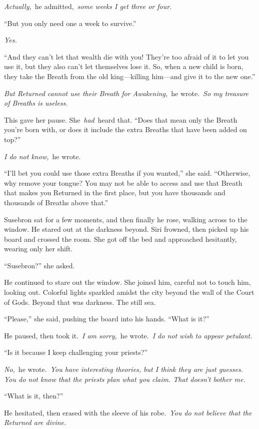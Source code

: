 \textit{Actually,}~he admitted,~\textit{some weeks I get three or four.}

“But you only need one a week to survive.”

\textit{Yes.}

“And they can’t let that wealth die with you! They’re too afraid of it to let you use it, but they also can’t let themselves lose it. So, when a new child is born, they take the Breath from the old king—killing him—and give it to the new one.”

\textit{But Returned cannot use their Breath for Awakening,}~he wrote.~\textit{So my treasure of Breaths is useless.}

This gave her pause. She~\textit{had}~heard that. “Does that mean only the Breath you’re born with, or does it include the extra Breaths that have been added on top?”

\textit{I do not know,}~he wrote.

“I’ll bet you could use those extra Breaths if you wanted,” she said. “Otherwise, why remove your tongue? You may not be able to access and use that Breath that makes you Returned in the first place, but you have thousands and thousands of Breaths above that.”

Susebron sat for a few moments, and then finally he rose, walking across to the window. He stared out at the darkness beyond. Siri frowned, then picked up his board and crossed the room. She got off the bed and approached hesitantly, wearing only her shift.

“Susebron?” she asked.

He continued to stare out the window. She joined him, careful not to touch him, looking out. Colorful lights sparkled amidst the city beyond the wall of the Court of Gods. Beyond that was darkness. The still sea.

“Please,” she said, pushing the board into his hands. “What is it?”

He paused, then took it.~\textit{I am sorry,}~he wrote.~\textit{I do not wish to appear petulant.}

“Is it because I keep challenging your priests?”

\textit{No,}~he wrote.~\textit{You have interesting theories, but I think they are just guesses. You do not know that the priests plan what you claim. That doesn’t bother me.}

“What is it, then?”

He hesitated, then erased with the sleeve of his robe.~\textit{You do not believe that the Returned are divine.}

